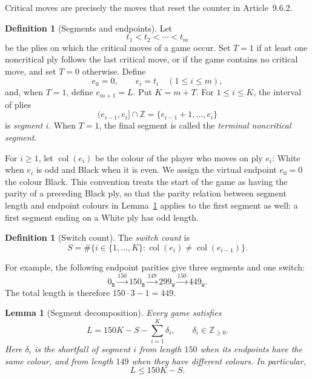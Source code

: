 \documentclass[11pt]{article}
\newtheorem{lemma}[theorem]{Lemma}
\theoremstyle{definition}
\newtheorem{definition}[theorem]{Definition}
\newcommand{\B}{\mathtt{B}}
\newcommand{\W}{\mathtt{W}}
\begin{document}
Critical moves are precisely the moves that reset the counter in
Article~9.6.2.

\begin{definition}[Segments and endpoints]\label{def:segments}
Let
\[
  t_1<t_2<\cdots<t_m
\]
be the plies on which the critical moves of a game occur. Set $T=1$ if at
least one noncritical ply follows the last critical move, or if the game
contains no critical move, and set $T=0$ otherwise. Define
\[
  e_0=0,\qquad e_i=t_i\quad(1\le i\le m),
\]
and, when $T=1$, define $e_{m+1}=L$. Put $K=m+T$. For
$1\le i\le K$, the interval of plies
\[
  (e_{i-1},e_i]\cap\mathbb Z
  =\{e_{i-1}+1,\ldots,e_i\}
\]
is \emph{segment $i$}. When $T=1$, the final segment is called the
\emph{terminal noncritical segment}.
\end{definition}

For $i\ge1$, let $\operatorname{col}(e_i)$ be the colour of the player who
moves on ply $e_i$: White when $e_i$ is odd and Black when it is even. We assign the virtual endpoint $e_0=0$ the colour Black. This convention
treats the start of the game as having the parity of a preceding Black
ply, so that the parity relation between segment length and endpoint
colours in Lemma~\ref{lem:decomposition} applies to the first segment
as well: a first segment ending on a White ply has odd length.



\begin{definition}[Switch count]\label{def:switch}
The \emph{switch count} is
\[
  S=\#\bigl\{i\in\{1,\ldots,K\}:
    \operatorname{col}(e_i)\ne\operatorname{col}(e_{i-1})\bigr\}.
\]
\end{definition}

For example, the following endpoint parities give three segments and one
switch:
\[
  0_{\B}\xrightarrow{150}150_{\B}
  \xrightarrow{149}299_{\W}
  \xrightarrow{150}449_{\W}.
\]
The total length is therefore $150\cdot3-1=449$.

\begin{lemma}[Segment decomposition]\label{lem:decomposition}
Every game satisfies
\begin{equation}\label{eq:decomposition}
  L=150K-S-\sum_{i=1}^{K}\delta_i,
  \qquad \delta_i\in\mathbb Z_{\ge0}.
\end{equation}
Here $\delta_i$ is the shortfall of segment $i$ from length $150$ when its
endpoints have the same colour, and from length $149$ when they have different
colours. In particular,
\[
  L\le150K-S.
\]
\end{lemma}
\end{document}
